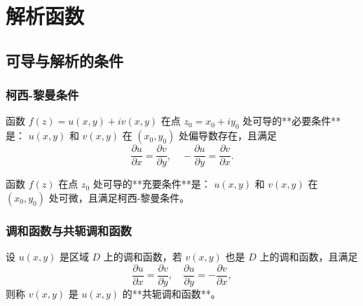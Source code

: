 \chapter{解析函数}

\section{可导与解析的条件}
\subsection{柯西-黎曼条件}
函数 \( f(z) = u(x,y) + iv(x,y) \) 在点 \( z_0 = x_0 + iy_0 \) 处可导的**必要条件**是：
\( u(x,y) \) 和 \( v(x,y) \) 在 \( (x_0,y_0) \) 处偏导数存在，且满足
\[
\frac{\partial u}{\partial x} = \frac{\partial v}{\partial y}, \quad -\frac{\partial u}{\partial y} = \frac{\partial v}{\partial x}.
\]

函数 \( f(z) \) 在点 \( z_0 \) 处可导的**充要条件**是：
\( u(x,y) \) 和 \( v(x,y) \) 在 \( (x_0,y_0) \) 处可微，且满足柯西-黎曼条件。

\subsection{调和函数与共轭调和函数}
设 \( u(x,y) \) 是区域 \( D \) 上的调和函数，若 \( v(x,y) \) 也是 \( D \) 上的调和函数，且满足
\[
\frac{\partial u}{\partial x} = \frac{\partial v}{\partial y}, \quad \frac{\partial u}{\partial y} = -\frac{\partial v}{\partial x},
\]
则称 \( v(x,y) \) 是 \( u(x,y) \) 的**共轭调和函数**。